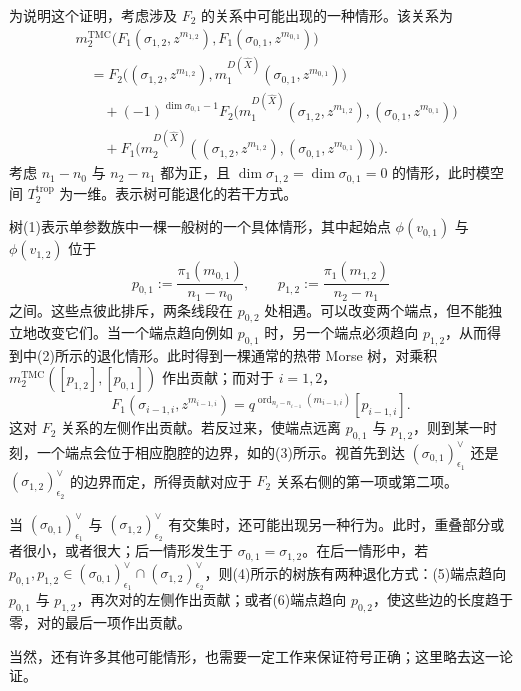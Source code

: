 为说明这个证明，考虑涉及 $F_2$ 的关系中可能出现的一种情形。该关系为
\begin{equation}\label{eq:8.26}
\begin{aligned}
&m_2^{\operatorname{TMC}}\bigl(F_1(\sigma_{1,2},z^{m_{1,2}}),
F_1(\sigma_{0,1},z^{m_{0,1}})\bigr)\\
&\quad=F_2\bigl((\sigma_{1,2},z^{m_{1,2}}),
m_1^{D(\widehat X)}(\sigma_{0,1},z^{m_{0,1}})\bigr)\\
&\qquad+(-1)^{\dim\sigma_{0,1}-1}
F_2\bigl(m_1^{D(\widehat X)}(\sigma_{1,2},z^{m_{1,2}}),
(\sigma_{0,1},z^{m_{0,1}})\bigr)\\
&\qquad+F_1\bigl(m_2^{D(\widehat X)}
((\sigma_{1,2},z^{m_{1,2}}),(\sigma_{0,1},z^{m_{0,1}}))\bigr).
\end{aligned}
\end{equation}
考虑 $n_1-n_0$ 与 $n_2-n_1$ 都为正，且 $\dim\sigma_{1,2}=\dim\sigma_{0,1}=0$ 的情形，此时模空间 $T_2^{\mathrm{trop}}$ 为一维。表示树可能退化的若干方式。
\begin{figure}[H]
\centering
{}
\BookNumberOnlyCaption\label{fig:8.40}
\end{figure}

树(1)表示单参数族中一棵一般树的一个具体情形，其中起始点 $\phi(v_{0,1})$ 与 $\phi(v_{1,2})$ 位于
\[
p_{0,1}:=\frac{\pi_1(m_{0,1})}{n_1-n_0},
\qquad
p_{1,2}:=\frac{\pi_1(m_{1,2})}{n_2-n_1}
\]
之间。这些点彼此排斥，两条线段在 $p_{0,2}$ 处相遇。可以改变两个端点，但不能独立地改变它们。当一个端点趋向例如 $p_{0,1}$ 时，另一个端点必须趋向 $p_{1,2}$，从而得到中(2)所示的退化情形。此时得到一棵通常的热带 Morse 树，对乘积 $m_2^{\operatorname{TMC}}([p_{1,2}],[p_{0,1}])$ 作出贡献；而对于 $i=1,2$，
\[
F_1(\sigma_{i-1,i},z^{m_{i-1,i}})
=q^{\operatorname{ord}_{n_i-n_{i-1}}(m_{i-1,i})}[p_{i-1,i}].
\]
这对 $F_2$ 关系的左侧作出贡献。若反过来，使端点远离 $p_{0,1}$ 与 $p_{1,2}$，则到某一时刻，一个端点会位于相应胞腔的边界，如的(3)所示。视首先到达 $(\sigma_{0,1})_{\epsilon_1}^\vee$ 还是 $(\sigma_{1,2})_{\epsilon_2}^\vee$ 的边界而定，所得贡献对应于 $F_2$ 关系右侧的第一项或第二项。

当 $(\sigma_{0,1})_{\epsilon_1}^\vee$ 与 $(\sigma_{1,2})_{\epsilon_2}^\vee$ 有交集时，还可能出现另一种行为。此时，重叠部分或者很小，或者很大；后一情形发生于 $\sigma_{0,1}=\sigma_{1,2}$。在后一情形中，若 $p_{0,1},p_{1,2}\in(\sigma_{0,1})_{\epsilon_1}^\vee\cap(\sigma_{1,2})_{\epsilon_2}^\vee$，则(4)所示的树族有两种退化方式：(5)端点趋向 $p_{0,1}$ 与 $p_{1,2}$，再次对的左侧作出贡献；或者(6)端点趋向 $p_{0,2}$，使这些边的长度趋于零，对的最后一项作出贡献。

当然，还有许多其他可能情形，也需要一定工作来保证符号正确；这里略去这一论证。
